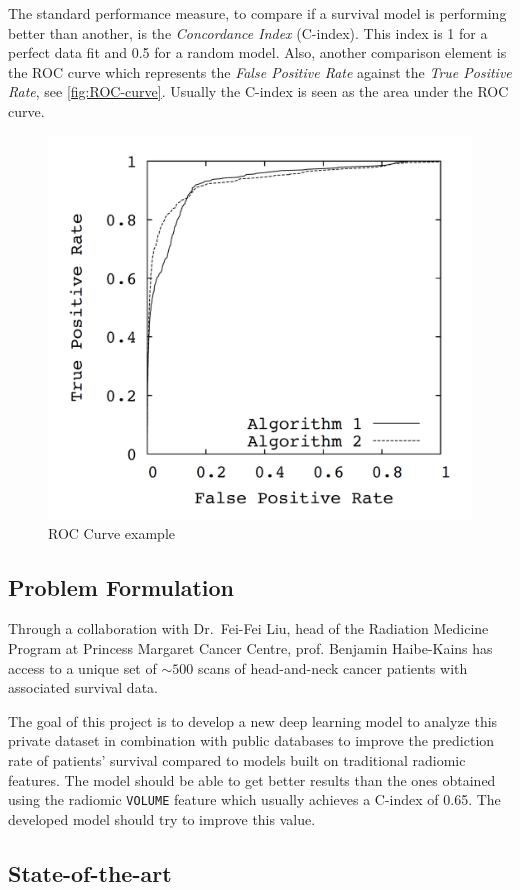 The standard performance measure, to compare if a survival 
model is performing better than another, is the \emph{Concordance Index} (C-index). This 
index is 1 for a perfect data fit and 0.5 for a random model. Also, another comparison 
element is the ROC curve which represents the \emph{False Positive Rate} against the 
\emph{True Positive Rate}, see \autoref{fig:ROC-curve}. Usually the C-index is seen as 
the area under the ROC curve.
~\cites{ROC-precision-recall}{RankingCI}

\begin{figure}
  \centering
  \includegraphics[width=.5\linewidth]{images/roc_curve}
  \caption{ROC Curve example\label{fig:ROC-curve}}
\end{figure}

\subsection{Problem Formulation}

Through a collaboration with Dr.~Fei-Fei Liu, head of the Radiation Medicine Program at Princess
Margaret Cancer Centre, prof. Benjamin Haibe-Kains has access to a unique set of \( {\sim}500 \) 
scans of head-and-neck cancer patients with associated survival data. 

The goal of this project is to develop a new deep learning model to analyze this private 
dataset in combination with public databases to improve the prediction rate of patients' 
survival compared to models built on traditional radiomic features. The model should be 
able to get better results than the ones obtained using the radiomic \texttt{VOLUME} feature
which usually achieves a C-index of 0.65. The developed model should try to improve this value.

\subsection{State-of-the-art}

